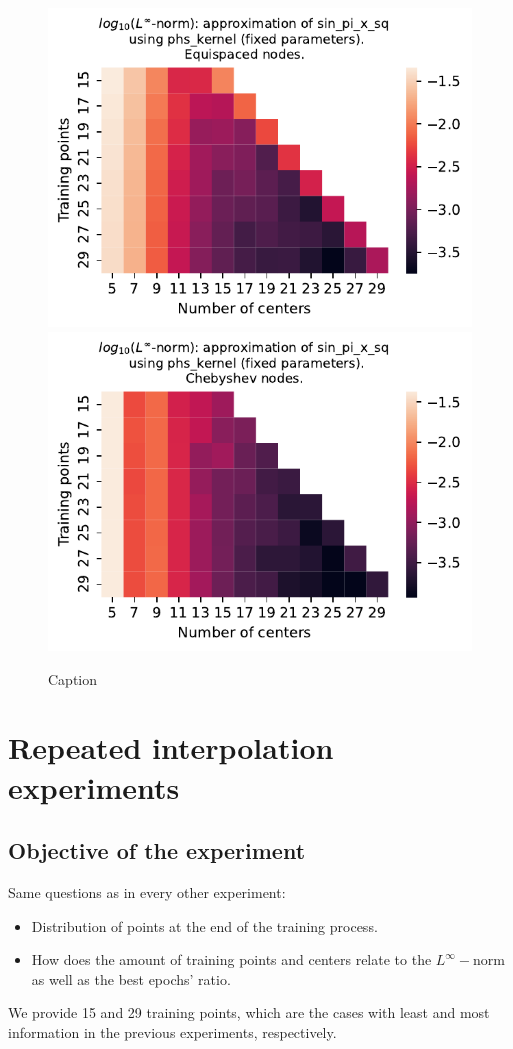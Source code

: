 \documentclass[12pt]{report} %
\begin{document}
\begin{figure}[ht]
  \centering

  \includegraphics[width=.49\textwidth]{imagenes/experiments/1d/least_squares/opt-sin_pi_x_sq-Kphs_kernel-Equi.pdf}
  \includegraphics[width=.49\textwidth]{imagenes/experiments/1d/least_squares/opt-sin_pi_x_sq-Kphs_kernel-Cheb.pdf}
  \caption{Caption}
  \label{fig:opt-sin-pi-x-sq-phs}
\end{figure}





\chapter*{Repeated interpolation experiments}\label{appendix-1d-sin-pi-x-sq}

\section*{Objective of the experiment}

Same questions as in every other experiment:
\begin{itemize}
  \item Distribution of points at the end of the training process.
  \item How does the amount of training points and centers relate to the $L^\infty-$norm
        as well as the best epochs' ratio.
\end{itemize}

We provide 15 and 29 training points, which are the cases with least and most information
in the previous experiments, respectively.
\end{document}

